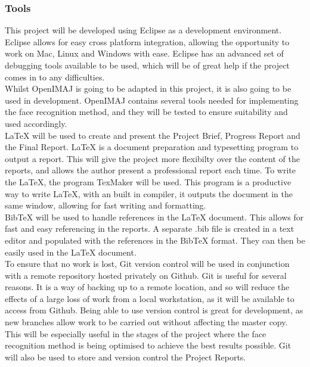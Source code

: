 \documentclass[12pt, a4paper]{article}
\begin{document}
\subsubsection{Tools} 
This project will be developed using Eclipse as a development environment. Eclipse allows for easy cross platform integration, allowing the opportunity to work on Mac, Linux and Windows with ease. Eclipse has an advanced set of debugging tools available to be used, which will be of great help if the project comes in to any difficulties.\\ 
Whilst OpenIMAJ is going to be adapted in this project, it is also going to be used in development. OpenIMAJ contains several tools needed for implementing the face recognition method, and they will be tested to ensure suitability and used accordingly. \\
\LaTeX{} will be used to create and present the Project Brief, Progress Report and the Final Report. \LaTeX{} is a document preparation and typesetting program to output a report. This will give the project more flexibilty over the content of the reports, and allows the author present a professional report each time. To write the \LaTeX{}, the program TexMaker will be used. This program is a productive way to write \LaTeX{}, with an built in compiler, it outputs the document in the same window, allowing for fast writing and formatting.\\
BibTeX will be used to handle references in the \LaTeX{} document. This allows for fast and easy referencing in the reports. A separate .bib file is created in a text editor and populated with the references in the BibTeX format. They can then be easily used in the \LaTeX{} document.\\
To ensure that no work is lost, Git version control will be used in conjunction with a remote repository hosted privately on Github. Git is useful for several reasons. It is a way of backing up to a remote location, and so will reduce the effects of a large loss of work from a local workstation, as it will be available to access from Github. Being able to use version control is great for development, as new branches allow work to be carried out without affecting the master copy. This will be especially useful in the stages of the project where the face recognition method is being optimised to achieve the best results possible. Git will also be used to store and version control the Project Reports.
\end{document}
